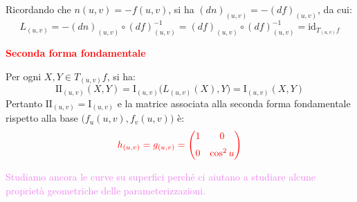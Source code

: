 \begin{esempio}
        Ricordando che $n(u,v) = -f(u,v)$, si ha $(dn)_{(u,v)} = -(df)_{(u,v)}$, da cui:
        \[
        L_{(u,v)} = -(dn)_{(u,v)} \circ (df)_{(u,v)}^{-1} = (df)_{(u,v)} \circ (df)_{(u,v)}^{-1} = \mathrm{id}_{T_{(u,v)}f}
        \]

        \bigskip
        \noindent \textcolor{red}{\textbf{Seconda forma fondamentale}}

        Per ogni $X, Y \in T_{(u,v)}f$, si ha:
        \[
        \mathrm{II}_{(u,v)}(X,Y) = \mathrm{I}_{(u,v)}\big(L_{(u,v)}(X), Y\big) = \mathrm{I}_{(u,v)}(X,Y)
        \]
        Pertanto $\mathrm{II}_{(u,v)} = \mathrm{I}_{(u,v)}$ e la matrice associata alla seconda forma fondamentale rispetto alla base $\big(f_u(u,v), f_v(u,v)\big)$ è:
        \[
        \textcolor{red}{h_{(u,v)} = g_{(u,v)} = 
        \begin{pmatrix}
        1 & 0 \\[6pt]
        0 & \cos^2 u
        \end{pmatrix}}
        \]
        \end{esempio}
        \newpage
        \textcolor{violet}{Studiamo ancora le curve su superfici perché ci aiutano a studiare alcune proprietà geometriche delle parameterizzazioni.}

